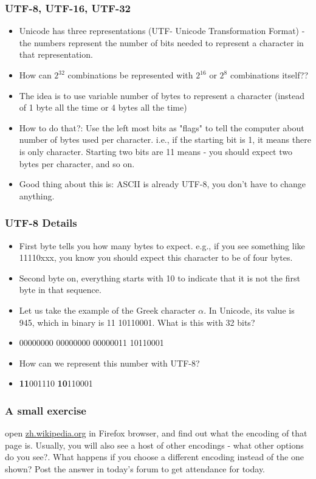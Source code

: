 \documentclass{beamer}
\begin{document}
\begin{frame}
\frametitle{UTF-8, UTF-16, UTF-32}
\begin{itemize}
\item Unicode has three representations (UTF- Unicode Transformation Format) - the numbers represent the number of bits needed to represent a character in that representation. \pause
\item How can $2^{32}$ combinations be represented with $2^{16}$ or $2^{8}$ combinations itself?? \pause
\item The idea is to use variable number of bytes to represent a character (instead of 1 byte all the time or 4 bytes all the time)
\item How to do that?: Use the left most bits as "flags" to tell the computer about number of bytes used per character. i.e., if the starting bit is 1, it means there is only character. Starting two bits are 11 means - you should expect two bytes per character, and so on. \pause
\item Good thing about this is: ASCII is already UTF-8, you don't have to change anything.
\end{itemize}
\end{frame}

\begin{frame}
\frametitle{UTF-8 Details}
\begin{itemize}
\item First byte tells you how many bytes to expect. e.g., if you see something like 11110xxx, you know you should expect this character to be of four bytes.
\item Second byte on, everything starts with 10 to indicate that it is not the first byte in that sequence. 
\item Let us take the example of the Greek character $\alpha$. In Unicode, its value is 945, which in binary is 11 10110001. What is this with 32 bits? \pause
\item 00000000 00000000 00000011 10110001
\item How can we represent this number with UTF-8? \pause
\item \textbf{11}001110 \textbf{10}110001
\end{itemize}
\end{frame}

\begin{frame}
\frametitle{A small exercise}
open \url{zh.wikipedia.org} in Firefox browser, and find out what the encoding of that page is. Usually, you will also see a host of other encodings - what other options do you see?. What happens if you choose a different encoding instead of the one shown? Post the answer in today's forum to get attendance for today.
\end{frame}
\end{document}
